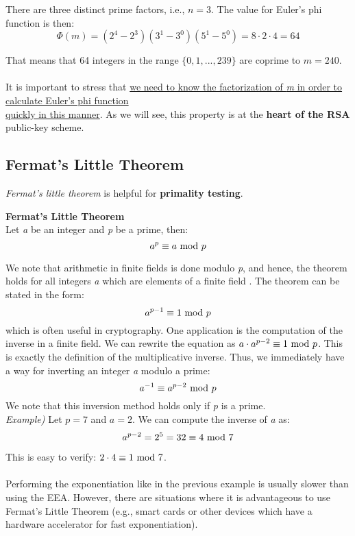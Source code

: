 There are three distinct prime factors, i.e., $n=3$. The value for Euler's phi function is then:
$$\Phi(m)=(2^4-2^3)(3^1-3^0)(5^1-5^0)=8\cdot2\cdot4=64$$

That means that 64 integers in the range $\{0,1,...,239\}$ are coprime to $m=240$.\\\\
It is important to stress that \underline{we need to know the factorization of \textit{m} in order to calculate Euler's phi function}\\\underline{quickly in this manner}. As we will see, this property is at the \textbf{heart of the RSA} public-key scheme.

\subsection{Fermat's Little Theorem}
\textit{Fermat's little theorem} is helpful for \textbf{primality testing}.
\begin{center}\begin{framed}
    \textbf{Fermat's Little Theorem}\\
    Let \textit{a} be an integer and \textit{p} be a prime, then:
    $$a^p\equiv a\text{ mod } p$$
\end{framed}\end{center}
We note that arithmetic in finite fields  is done modulo \textit{p}, and hence, the theorem holds for all integers \textit{a} which are elements of a finite field . The theorem can be stated in the form:
$$a^{p-1}\equiv1\text{ mod } p$$
which is often useful in cryptography. One application is the computation of the inverse in a finite field. We can rewrite the equation as $a\cdot a^{p-2}\equiv1\text{ mod } p$. This is exactly the definition of the multiplicative inverse. Thus, we immediately have a way for inverting an integer \textit{a} modulo a prime:
$$a^{-1}\equiv a^{p-2}\text{ mod } p$$
We note that this inversion method holds only if \textit{p} is a prime.\\

\textit{Example)} Let $p=7$ and $a=2$. We can compute the inverse of \textit{a} as:
$$a^{p-2}=2^5=32\equiv 4\text{ mod }7$$

This is easy to verify: $2\cdot4\equiv1\text{ mod }7$.\\\\
Performing the exponentiation like in the previous example is usually slower than using the EEA. However, there are situations where it is advantageous to use Fermat's Little Theorem (e.g., smart cards or other devices which have a hardware accelerator for fast exponentiation).

